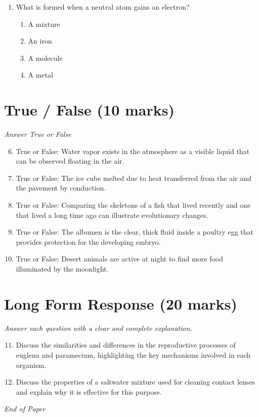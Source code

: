 \documentclass[12pt]{article}
\begin{document}
\begin{enumerate}[label=\arabic*.]
\begin{enumerate}[label=(\alph*)]
    \item neutralize the solution with a base
    \item dilute the solution with more acid
    \item absorb the liquid with paper towels
\end{enumerate}
\item What is formed when a neutral atom gains an electron?
\begin{enumerate}[label=(\alph*)]
    \item A mixture
    \item An iron
    \item A molecule
    \item A metal
\end{enumerate}
\end{enumerate}

\section*{True / False (10 marks)}
\textit{Answer True or False}
\begin{enumerate}[label=\arabic*.]
\setcounter{enumi}{5}
\item True or False: Water vapor exists in the atmosphere as a visible liquid that can be observed floating in the air.
\item True or False: The ice cube melted due to heat transferred from the air and the pavement by conduction.
\item True or False: Comparing the skeletons of a fish that lived recently and one that lived a long time ago can illustrate evolutionary changes.
\item True or False: The albumen is the clear, thick fluid inside a poultry egg that provides protection for the developing embryo.
\item True or False: Desert animals are active at night to find more food illuminated by the moonlight.
\end{enumerate}

\section*{Long Form Response (20 marks)}
\textit{Answer each question with a clear and complete explanation.}
\begin{enumerate}[label=\arabic*.]
\setcounter{enumi}{10}
\item Discuss the similarities and differences in the reproductive processes of euglena and paramecium, highlighting the key mechanisms involved in each organism.
\item Discuss the properties of a saltwater mixture used for cleaning contact lenses and explain why it is effective for this purpose.
\end{enumerate}

\vfill
\noindent\textit{End of Paper}
\end{document}
